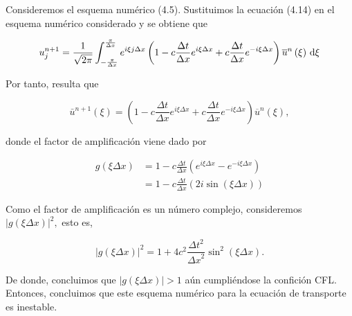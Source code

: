 \begin{example}
  Consideremos el esquema numérico (4.5).
  Sustituimos la ecuación (4.14) en el esquema numérico considerado y
  se obtiene que

  \begin{equation*}
    u^{n+1}_{j}=
    \frac{1}{\sqrt{2\pi}}
    \int_{-\frac{\pi}{\Delta x}}^{\frac{\pi}{\Delta x}}
    e^{i\xi j \Delta x}
    \left(
    1-c\frac{\Delta t}{\Delta x}
    e^{i \xi \Delta x}+
    c\frac{\Delta t}{\Delta x}
    e^{-i\xi\Delta x}\right)
    \overline{u}^{n}
    \left(\xi\right)
    \dl\xi
  \end{equation*}

  Por tanto, resulta que

  \begin{equation*}
    \bar{u}^{n+1}
    \left(\xi\right)=
    \left(
    1-
    c\frac{\Delta t}{\Delta x}
    e^{i\xi\Delta x}+
    c\frac{\Delta t}{\Delta x}
    e^{-i\xi\Delta x}
    \right)
    \overline{u}^{n}
    \left(\xi\right),
  \end{equation*}

  donde el factor de amplificación viene dado por

  \begin{align*}
    g
    \left(\xi\Delta x\right) & =
    1-
    c\frac{\Delta t}{\Delta x}
    \left(
    e^{i\xi\Delta x}-
    e^{-i\xi\Delta x}
    \right)                      \\
                             & =
    1-
    c\frac{\Delta t}{\Delta x}
    \left(
    2i\sin
    \left(\xi\Delta x\right)
    \right)
  \end{align*}

  Como el factor de amplificación es un número complejo, consideremos
  \begin{math}
    {\left|
      g\left(\xi\Delta x\right)
      \right|}^{2},
  \end{math}
  esto es,

  \begin{equation*}
    \left|
    g
    \left(\xi\Delta x\right)
    \right|^{2}=
    1+
    4c^{2}
    \frac{{\Delta t}^{2}}{{\Delta x}^{2}}
    \sin^{2}
    \left(\xi\Delta x\right).
  \end{equation*}

  De donde, concluimos que
  \begin{math}
    \left|
    g\left(\xi\Delta x\right)
    \right|>
    1
  \end{math}
  aún cumpliéndose la confición CFL.
  Entonces, concluimos que este esquema numérico para la ecuación de
  transporte es inestable.
\end{example}


